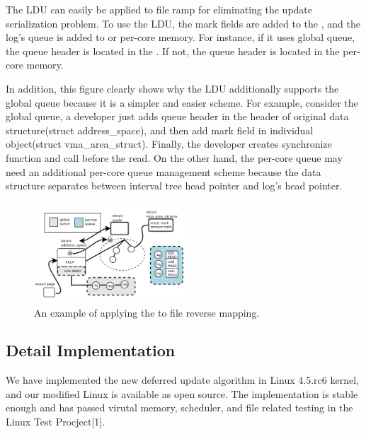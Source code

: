 The LDU can easily be applied to file ramp for eliminating the update
serialization problem.
To use the LDU, the mark fields are added to the , and the log's queue is added to  or per-core
memory.
For instance, if it uses global queue, the queue header is located in the
. If not, the queue header is located in the
per-core memory.

In addition, this figure clearly shows why the LDU additionally supports the
global queue because it is a simpler and easier scheme.
For example, consider the global queue, a developer just adds queue header in
the header of original data structure(struct address\_space), and then add mark
field in individual object(struct vma\_area\_struct).
Finally, the developer creates synchronize function and call before the
read.
On the other hand, the per-core queue may need an additional per-core
queue management scheme because the data structure separates between interval
tree head pointer and log's head pointer.

\begin{figure}[tb]
  \begin{center}
     \includegraphics[width=0.5\textwidth,height=0.5\textheight,keepaspectratio]{fig/file_rmap}
  \end{center}
  \caption{An example of applying the  to file reverse mapping. }
  \label{fig:fileramp}
\end{figure}

\subsection{Detail Implementation}\label{sec:implementation}

We have implemented the new deferred update algorithm in Linux 4.5.rc6 kernel,
and our modified Linux is available as open source. 
The implementation is stable enough and has passed virutal memory, scheduler,
and file related testing in the Linux Test Procject[1].


